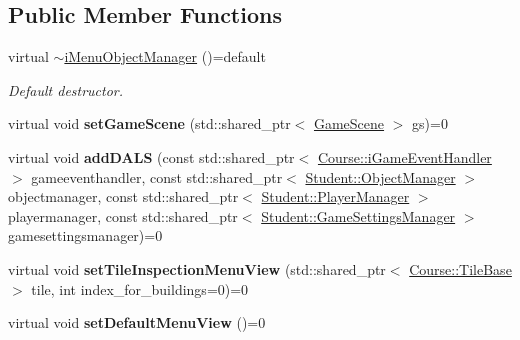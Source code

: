 \subsection*{Public Member Functions}
\begin{DoxyCompactItemize}
\item 
\hypertarget{class_student_1_1i_menu_object_manager_a46b2da22fa6451c4943b32480c81571d}{virtual \hyperlink{class_student_1_1i_menu_object_manager_a46b2da22fa6451c4943b32480c81571d}{$\sim$i\-Menu\-Object\-Manager} ()=default}\label{class_student_1_1i_menu_object_manager_a46b2da22fa6451c4943b32480c81571d}

\begin{DoxyCompactList}\small\item\em Default destructor. \end{DoxyCompactList}\item 
\hypertarget{class_student_1_1i_menu_object_manager_a9be4e7565ac3e61cd29c58cf98537095}{virtual void {\bfseries set\-Game\-Scene} (std\-::shared\-\_\-ptr$<$ \hyperlink{class_student_1_1_game_scene}{Game\-Scene} $>$ gs)=0}\label{class_student_1_1i_menu_object_manager_a9be4e7565ac3e61cd29c58cf98537095}

\item 
\hypertarget{class_student_1_1i_menu_object_manager_a18d9184b7469228de7d155d741f93034}{virtual void {\bfseries add\-D\-A\-L\-S} (const std\-::shared\-\_\-ptr$<$ \hyperlink{class_course_1_1i_game_event_handler}{Course\-::i\-Game\-Event\-Handler} $>$ gameeventhandler, const std\-::shared\-\_\-ptr$<$ \hyperlink{class_student_1_1_object_manager}{Student\-::\-Object\-Manager} $>$ objectmanager, const std\-::shared\-\_\-ptr$<$ \hyperlink{class_student_1_1_player_manager}{Student\-::\-Player\-Manager} $>$ playermanager, const std\-::shared\-\_\-ptr$<$ \hyperlink{class_student_1_1_game_settings_manager}{Student\-::\-Game\-Settings\-Manager} $>$ gamesettingsmanager)=0}\label{class_student_1_1i_menu_object_manager_a18d9184b7469228de7d155d741f93034}

\item 
\hypertarget{class_student_1_1i_menu_object_manager_a8a2126a64a92e671feaa99a2a69eafc1}{virtual void {\bfseries set\-Tile\-Inspection\-Menu\-View} (std\-::shared\-\_\-ptr$<$ \hyperlink{class_course_1_1_tile_base}{Course\-::\-Tile\-Base} $>$ tile, int index\-\_\-for\-\_\-buildings=0)=0}\label{class_student_1_1i_menu_object_manager_a8a2126a64a92e671feaa99a2a69eafc1}

\item 
\hypertarget{class_student_1_1i_menu_object_manager_a600c398da1496297b97936ed938c0f74}{virtual void {\bfseries set\-Default\-Menu\-View} ()=0}\label{class_student_1_1i_menu_object_manager_a600c398da1496297b97936ed938c0f74}


\end{DoxyCompactItemize}
